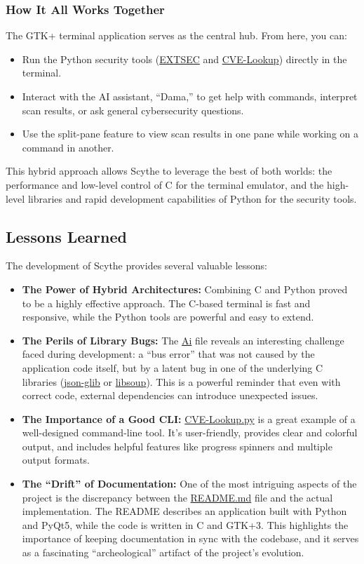 \documentclass{article}
\begin{document}
\subsubsection{How It All Works Together}\label{how-it-all-works-together}

The GTK+ terminal application serves as the central hub. From here, you
can:

\begin{itemize}
\item
  Run the Python security tools (\url{EXTSEC} and
  \url{CVE-Lookup}) directly in the terminal.
\item
  Interact with the AI assistant, ``Dama,'' to get help with commands,
  interpret scan results, or ask general cybersecurity questions.
\item
  Use the split-pane feature to view scan results in one pane while
  working on a command in another.
\end{itemize}

This hybrid approach allows Scythe to leverage the best of both worlds:
the performance and low-level control of C for the terminal emulator,
and the high-level libraries and rapid development capabilities of
Python for the security tools.

\subsection{Lessons Learned}\label{lessons-learned}

The development of Scythe provides several valuable lessons:

\begin{itemize}
\item
  \textbf{The Power of Hybrid Architectures:} Combining C and Python
  proved to be a highly effective approach. The C-based terminal is fast
  and responsive, while the Python tools are powerful and easy to
  extend.
\item
  \textbf{The Perils of Library Bugs:} The \url{Ai} file reveals an
  interesting challenge faced during development: a ``bus error'' that
  was not caused by the application code itself, but by a latent bug in
  one of the underlying C libraries (\url{json-glib} or \url{libsoup}).
  This is a powerful reminder that even with correct code, external
  dependencies can introduce unexpected issues.
\item
  \textbf{The Importance of a Good CLI:} \url{CVE-Lookup.py} is a
  great example of a well-designed command-line tool. It's
  user-friendly, provides clear and colorful output, and includes
  helpful features like progress spinners and multiple output formats.
\item
  \textbf{The ``Drift'' of Documentation:} One of the most intriguing
  aspects of the project is the discrepancy between the \url{README.md}
  file and the actual implementation. The README
  describes an application built with Python and PyQt5, while the code
  is written in C and GTK+3. This highlights the importance of keeping
  documentation in sync with the codebase, and it serves as a
  fascinating ``archeological'' artifact of the project's evolution.
\end{itemize}
\end{document}
